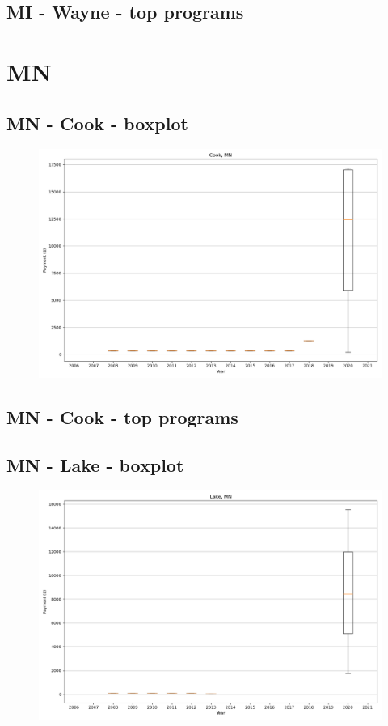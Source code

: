 \subsection*{MI - Wayne - top programs}

\newpage
\section*{MN}
\subsection*{MN - Cook - boxplot}
\begin{figure}[h]
\centering
\includegraphics[width=7in]{../output/boxplots/counties/Cook-MN_boxplot.png}
\end{figure}


\subsection*{MN - Cook - top programs}

\newpage
\subsection*{MN - Lake - boxplot}
\begin{figure}[h]
\centering
\includegraphics[width=7in]{../output/boxplots/counties/Lake-MN_boxplot.png}
\end{figure}


